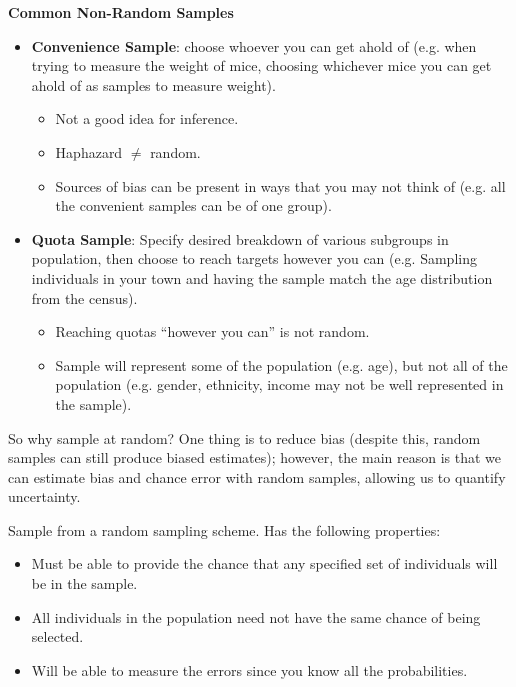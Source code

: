 \textbf{Common Non-Random Samples}
\begin{itemize}
\item \textbf{Convenience Sample}: choose whoever you can get ahold of (e.g. when trying to measure the weight of mice, choosing whichever mice you can get ahold of as samples to measure weight).
\begin{itemize}
\item Not a good idea for inference.
\item Haphazard $\neq$ random.
\item Sources of bias can be present in ways that you may not think of (e.g. all the convenient samples can be of one group).
\end{itemize}
\item \textbf{Quota Sample}: Specify desired breakdown of various subgroups in population, then choose to reach targets however you can (e.g. Sampling individuals in your town and having the sample match the age distribution from the census).
\begin{itemize}
\item Reaching quotas ``however you can'' is not random.
\item Sample will represent some of the population (e.g. age), but not all of the population (e.g. gender, ethnicity, income may not be well represented in the sample).
\end{itemize}
\end{itemize}
So why sample at random? One thing is to reduce bias (despite this, random samples can still produce biased estimates); however, the main reason is that we can estimate bias and chance error with random samples, allowing us to quantify uncertainty.
\begin{definition}{Sample from a random sampling scheme. Has the following properties:
\begin{itemize}
\item Must be able to provide the chance that any specified set of individuals will be in the sample.
\item All individuals in the population need not have the same chance of being selected.
\item Will be able to measure the errors since you know all the probabilities.
\end{itemize}
}
\end{definition}

